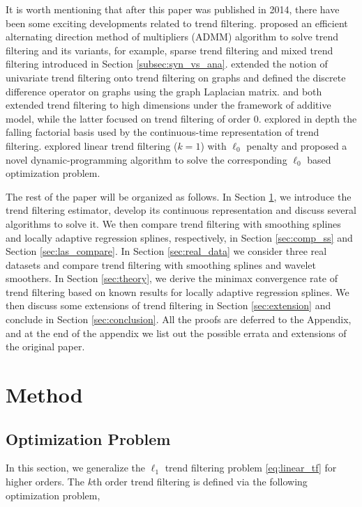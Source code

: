 \documentclass[a4paper]{article}
\begin{document}
It is worth mentioning that after this paper was published in 2014, there have been some exciting developments related to trend filtering. \cite{ramdas2016fast} proposed an efficient alternating direction method of multipliers (ADMM) algorithm to solve trend filtering and its variants, for example, sparse trend filtering and mixed trend filtering introduced in Section \ref{subsec:syn_vs_ana}. \cite{wang2016trend} extended the notion of univariate trend filtering onto trend filtering on graphs and defined the discrete difference operator on graphs using the graph Laplacian matrix. \cite{sadhanala2017additive} and \cite{petersen2016fused} both extended trend filtering to high dimensions under the framework of additive model, while the latter focused on trend filtering of order $0$. \cite{wang2014falling} explored in depth the falling factorial basis used by the continuous-time representation of trend filtering. \cite{maidstone2017detecting} explored linear trend filtering ($k =1$) with $\ell_0$ penalty and proposed a novel dynamic-programming algorithm to solve the corresponding $\ell_0$ based optimization problem. 

The rest of the paper will be organized as follows. In Section \ref{sec:method}, we introduce the trend filtering estimator, develop its continuous representation and discuss several algorithms to solve it. We then compare trend filtering with smoothing splines and locally adaptive regression splines, respectively, in Section \ref{sec:comp_ss} and Section \ref{sec:las_compare}. In Section \ref{sec:real_data}  we consider three real datasets and compare trend filtering with smoothing splines and wavelet smoothers. In Section \ref{sec:theory}, we derive the minimax convergence rate of trend filtering based on known results for locally adaptive regression splines. We then discuss some extensions of trend filtering in Section \ref{sec:extension} and conclude in Section \ref{sec:conclusion}. All the proofs are deferred to the Appendix, and at the end of the appendix we list out the possible errata and extensions of the original paper.


\section{Method}
\label{sec:method}

\subsection{Optimization Problem}
\label{subsec:opt_problem}
In this section, we generalize the $\ell_1$ trend filtering problem \eqref{eq:linear_tf} for higher orders. The $k$th order trend filtering is defined via the following optimization problem,
\end{document}
